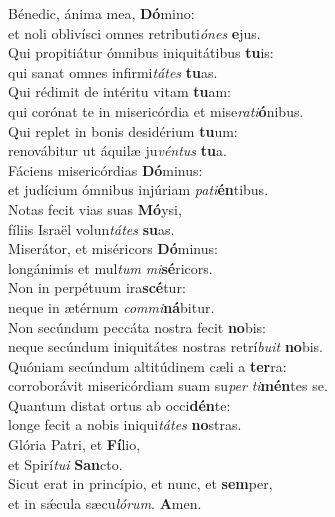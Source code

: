 \evenverse Bénedic, ánima mea, \textbf{Dó}mino:~\*\\
\evenverse et noli oblivísci omnes retributi\textit{ó}\textit{nes} \textbf{e}jus.\\
\oddverse Qui propitiátur ómnibus iniquitátibus \textbf{tu}is:~\*\\
\oddverse qui sanat omnes infirmi\textit{tá}\textit{tes} \textbf{tu}as.\\
\evenverse Qui rédimit de intéritu vitam \textbf{tu}am:~\*\\
\evenverse qui corónat te in misericórdia et mise\textit{ra}\textit{ti}\textbf{ó}nibus.\\
\oddverse Qui replet in bonis desidérium \textbf{tu}um:~\*\\
\oddverse renovábitur ut áquilæ ju\textit{vén}\textit{tus} \textbf{tu}a.\\
\evenverse Fáciens misericórdias \textbf{Dó}minus:~\*\\
\evenverse et judícium ómnibus injúriam \textit{pa}\textit{ti}\textbf{én}tibus.\\
\oddverse Notas fecit vias suas \textbf{Mó}ysi,~\*\\
\oddverse fíliis Israël volun\textit{tá}\textit{tes} \textbf{su}as.\\
\evenverse Miserátor, et miséricors \textbf{Dó}minus:~\*\\
\evenverse longánimis et mul\textit{tum} \textit{mi}\textbf{sé}ricors.\\
\oddverse Non in perpétuum ira\textbf{scé}tur:~\*\\
\oddverse neque in ætérnum \textit{com}\textit{mi}\textbf{ná}bitur.\\
\evenverse Non secúndum peccáta nostra fecit \textbf{no}bis:~\*\\
\evenverse neque secúndum iniquitátes nostras retrí\textit{bu}\textit{it} \textbf{no}bis.\\
\oddverse Quóniam secúndum altitúdinem cæli a \textbf{ter}ra:~\*\\
\oddverse corroborávit misericórdiam suam su\textit{per} \textit{ti}\textbf{mén}tes se.\\
\evenverse Quantum distat ortus ab occi\textbf{dén}te:~\*\\
\evenverse longe fecit a nobis iniqui\textit{tá}\textit{tes} \textbf{no}stras.\\
\oddverse Glória Patri, et \textbf{Fí}lio,~\*\\
\oddverse et Spirí\textit{tu}\textit{i} \textbf{San}cto.\\
\evenverse Sicut erat in princípio, et nunc, et \textbf{sem}per,~\*\\
\evenverse et in sǽcula sæcu\textit{ló}\textit{rum}. \textbf{A}men.\\
